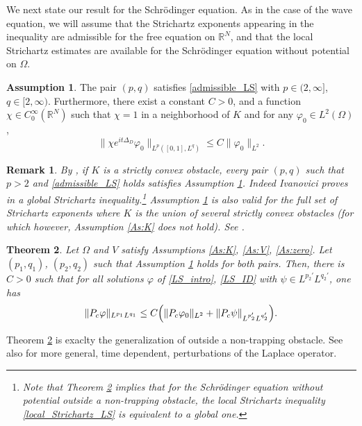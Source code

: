 \documentclass[10pt,leqno]{amsart}
\newtheorem{theorem}{Theorem}[section]
\newtheorem{remark}[theorem]{Remark}
\theoremstyle{definition}%
\newtheorem{assumption}{Assumption}
\theoremstyle{remark}
\numberwithin{equation}{section}
\newcommand{\R}{\mathbb{R}}
\renewcommand{\^}{\widehat}%
\begin{document}
We next state our result for the Schr\"odinger equation. As in the case of the wave equation, we will assume that the Strichartz exponents appearing in the inequality are admissible for the free equation on $\R^N$, and that the local Strichartz estimates are available for the Schr\"odinger equation without potential on $\Omega$. %



\begin{assumption}
\label{As:pqLS}
The pair $(p,q)$ satisfies \eqref{admissible_LS} with $p\in (2,\infty]$, $q\in [2,\infty)$. Furthermore,  there exist a constant  $C>0$, and a function $\chi\in C_0^{\infty}(\R^N)$ such that $\chi=1$ in a neighborhood of $K$ and for any $\varphi_0\in L^2(\Omega)$,
\begin{equation}
\label{local_Strichartz_LS}
\|\chi e^{it\Delta_D}\varphi_0\|_{L^{p}([0,1],L^{q})}\leq C\|\varphi_0\|_{L^2}.
\end{equation}
\end{assumption}
\begin{remark}
\label{R:pqLS}
By \cite{IvanoviciNLS}, if $K$ is a strictly convex obstacle, every pair $(p,q)$ such that $p>2$ and \eqref{admissible_LS} holds satisfies Assumption \ref{As:pqLS}. Indeed Ivanovici proves in \cite{IvanoviciNLS} a global Strichartz inequality.\footnote{Note that Theorem \ref{T:LS} implies that for the Schr\"odinger equation without potential outside a non-trapping obstacle, the local Strichartz inequality \eqref{local_Strichartz_LS} is equivalent to a global one.} Assumption \ref{As:pqLS} is also valid for the full set of Strichartz exponents where $K$ is the union of several strictly convex obstacles (for which however, Assumption \ref{As:K} does not hold). See \cite{Lafontaine18P}.
\end{remark}


\begin{theorem}
 \label{T:LS}
 	Let $\Omega$ and $V$ satisfy Assumptions \ref{As:K}, \ref{As:V}, \ref{As:zero}. Let $(p_1,q_1)$, $(p_2,q_2)$ such that Assumption \ref{As:pqLS} holds for both pairs. Then, there is $C>0$ such that for all solutions $\varphi$ of \eqref{LS_intro}, \eqref{LS_ID} with $\psi\in  L^{p_2'}L^{q_2'}$, one has
	\begin{equation}
	\label{eq:strichartzLS}
	\|P_c \varphi\|_{L^{p_1}L^{q_1}}\le C\Bigl(\|P_c\varphi_0\|_{L^2}+\|P_c \psi\|_{L^{p_2'}L^{q_2'}}\Bigr).
	\end{equation}
\end{theorem}
Theorem \ref{T:LS} is exaclty the generalization of \cite[Theorem 1.4]{RodnianskiSchlag04} outside a non-trapping obstacle. See also \cite{MaMeTa08} for more general, time dependent, perturbations of the Laplace operator.
\end{document}
